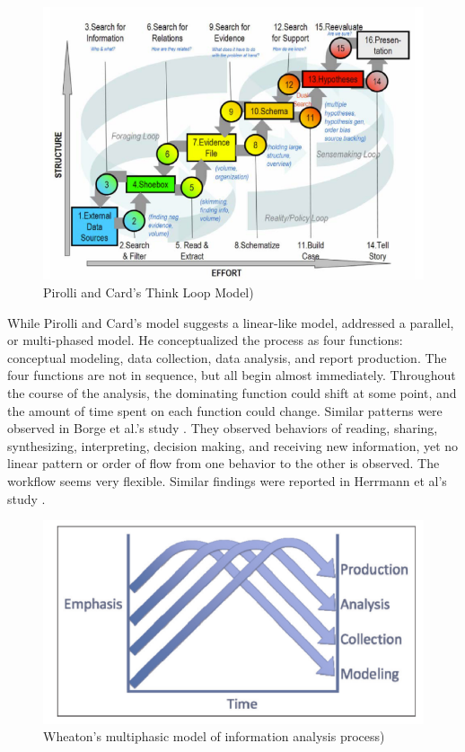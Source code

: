 \begin{figure}
	\centering
	\includegraphics[width=.8\columnwidth]{02-Literature/img/pirolli.png}
	\caption{Pirolli and Card's Think Loop Model)\label{fig:pirolli}}
\end{figure}

While Pirolli and Card's model suggests a linear-like model, \cite{Wheaton2011} addressed a 
parallel, or multi-phased model. He conceptualized the process as four functions: conceptual modeling, data collection, data analysis, and report production. The four functions are not in sequence, but all begin almost immediately. Throughout the course of the analysis, the dominating function could shift at some point, and the amount of time spent on each function could change. Similar patterns were observed in Borge et al.'s study \citeyearpar{Borge2012}. They observed behaviors of reading, sharing, synthesizing, interpreting, decision making, and receiving new information, yet no linear pattern or order of flow from one behavior to the other is observed. The workflow seems very flexible. Similar findings were reported in Herrmann et al's study \citeyearpar{Herrmann2013a}.

\begin{figure}
	\centering
	\includegraphics[width=\columnwidth]{02-Literature/img/wheaton.png}
	\caption{Wheaton's multiphasic model of information analysis process)\label{fig:wheaton}}
\end{figure}

